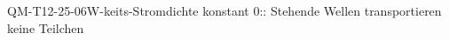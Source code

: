 
\begin{CONC}{QM-T12-25-06}{W-keits-Stromdichte konstant 0:: Stehende Wellen transportieren keine Teilchen}
\end{CONC}
